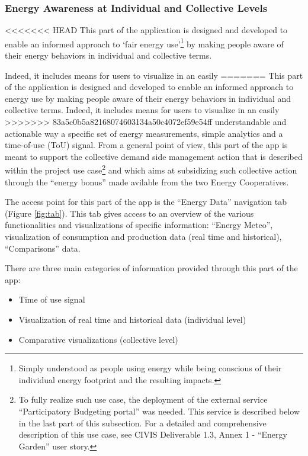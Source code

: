 \subsubsection{Energy Awareness at Individual and Collective Levels}
\label{sec:energydata}

<<<<<<< HEAD
This part of the application is designed and developed to enable an informed approach to `fair energy use'\footnote{Simply understood as people using energy while
being conscious of their individual energy footprint and the resulting impacts.} by making people aware of their
energy behaviors in individual and collective terms.

Indeed, it includes means for users to visualize in an easily
=======
This part of the application is designed and developed to enable an informed approach to energy use by making people aware of their
energy behaviors in individual and collective terms. Indeed, it includes means for users to visualize in an easily
>>>>>>> 83a5c0b5a82168074603134a50c4072ef59e54ff
understandable and actionable way a specific set of energy measurements, simple analytics and a time-of-use (ToU) signal.
From a general point of view, this part of the app is meant to support the collective demand side management
action that is described within the project use case\footnote{To fully realize such use case, the deployment of the external service ``Participatory Budgeting portal''
was needed. This service is described below in the last part of this subsection.
For a detailed and comprehensive description of this use case, see CIVIS Deliverable 1.3, Annex 1 - ``Energy Garden'' user story.}
and which aims at subsidizing such collective action through the ``energy bonus'' made avilable from the two Energy Cooperatives.

The access point for this part of the app is the ``Energy Data'' navigation tab (Figure \ref{fig:tab}). This tab gives access to an
overview of the various functionalities and visualizations of specific information: ``Energy Meteo'', visualization of consumption and production data (real time and historical),
``Comparisons'' data.

There are three main categories of information provided through this part of the app:
\begin{itemize}
 \item Time of use signal
 \item Visualization of real time and historical data (individual level)
 \item Comparative visualizations (collective level)
\end{itemize}

